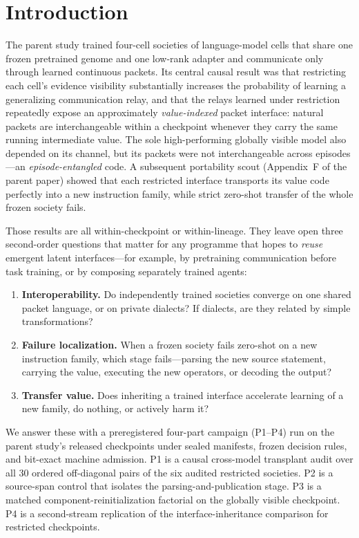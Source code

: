 \documentclass[11pt]{article}
\begin{document}
\section{Introduction}\label{sec:intro}

The parent study \citep{marincat2026populus} trained four-cell societies of language-model cells that share one frozen pretrained genome and one low-rank adapter and communicate only through learned continuous packets. Its central causal result was that restricting each cell's evidence visibility substantially increases the probability of learning a generalizing communication relay, and that the relays learned under restriction repeatedly expose an approximately \emph{value-indexed} packet interface: natural packets are interchangeable within a checkpoint whenever they carry the same running intermediate value. The sole high-performing globally visible model also depended on its channel, but its packets were not interchangeable across episodes---an \emph{episode-entangled} code. A subsequent portability scout (Appendix~F of the parent paper) showed that each restricted interface transports its value code perfectly into a new instruction family, while strict zero-shot transfer of the whole frozen society fails.

Those results are all within-checkpoint or within-lineage. They leave open three second-order questions that matter for any programme that hopes to \emph{reuse} emergent latent interfaces---for example, by pretraining communication before task training, or by composing separately trained agents:

\begin{enumerate}
\item \textbf{Interoperability.} Do independently trained societies converge on one shared packet language, or on private dialects? If dialects, are they related by simple transformations?
\item \textbf{Failure localization.} When a frozen society fails zero-shot on a new instruction family, which stage fails---parsing the new source statement, carrying the value, executing the new operators, or decoding the output?
\item \textbf{Transfer value.} Does inheriting a trained interface accelerate learning of a new family, do nothing, or actively harm it?
\end{enumerate}

We answer these with a preregistered four-part campaign (P1--P4) run on the parent study's released checkpoints under sealed manifests, frozen decision rules, and bit-exact machine admission. P1 is a causal cross-model transplant audit over all 30 ordered off-diagonal pairs of the six audited restricted societies. P2 is a source-span control that isolates the parsing-and-publication stage. P3 is a matched component-reinitialization factorial on the globally visible checkpoint. P4 is a second-stream replication of the interface-inheritance comparison for restricted checkpoints.
\end{document}
